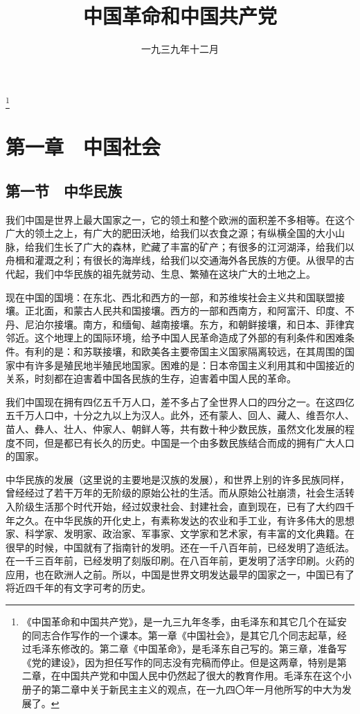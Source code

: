 
\title{中国革命和中国共产党}
\date{一九三九年十二月}
\thanks{《中国革命和中国共产党》，是一九三九年冬季，由毛泽东和其它几个在延安的同志合作写作的一个课本。第一章《中国社会》，是其它几个同志起草，经过毛泽东修改的。第二章《中国革命》，是毛泽东自己写的。第三章，准备写《党的建设》，因为担任写作的同志没有完稿而停止。但是这两章，特别是第二章，在中国共产党和中国人民中仍然起了很大的教育作用。毛泽东在这个小册子的第二章中关于新民主主义的观点，在一九四〇年一月他所写的中大为发展了。}
\maketitle


\section{第一章　中国社会}

\subsection{第一节　中华民族}

我们中国是世界上最大国家之一，它的领土和整个欧洲的面积差不多相等。在这个广大的领土之上，有广大的肥田沃地，给我们以衣食之源；有纵横全国的大小山脉，给我们生长了广大的森林，贮藏了丰富的矿产；有很多的江河湖泽，给我们以舟楫和灌溉之利；有很长的海岸线，给我们以交通海外各民族的方便。从很早的古代起，我们中华民族的祖先就劳动、生息、繁殖在这块广大的土地之上。

现在中国的国境：在东北、西北和西方的一部，和苏维埃社会主义共和国联盟接壤。正北面，和蒙古人民共和国接壤。西方的一部和西南方，和阿富汗、印度、不丹、尼泊尔接壤。南方，和缅甸、越南接壤。东方，和朝鲜接壤，和日本、菲律宾邻近。这个地理上的国际环境，给予中国人民革命造成了外部的有利条件和困难条件。有利的是：和苏联接壤，和欧美各主要帝国主义国家隔离较远，在其周围的国家中有许多是殖民地半殖民地国家。困难的是：日本帝国主义利用其和中国接近的关系，时刻都在迫害着中国各民族的生存，迫害着中国人民的革命。

我们中国现在拥有四亿五千万人口，差不多占了全世界人口的四分之一。在这四亿五千万人口中，十分之九以上为汉人。此外，还有蒙人、回人、藏人、维吾尔人、苗人、彝人、壮人、仲家人、朝鲜人等，共有数十种少数民族，虽然文化发展的程度不同，但是都已有长久的历史。中国是一个由多数民族结合而成的拥有广大人口的国家。

中华民族的发展（这里说的主要地是汉族的发展），和世界上别的许多民族同样，曾经经过了若干万年的无阶级的原始公社的生活。而从原始公社崩溃，社会生活转入阶级生活那个时代开始，经过奴隶社会、封建社会，直到现在，已有了大约四千年之久。在中华民族的开化史上，有素称发达的农业和手工业，有许多伟大的思想家、科学家、发明家、政治家、军事家、文学家和艺术家，有丰富的文化典籍。在很早的时候，中国就有了指南针的发明。还在一千八百年前，已经发明了造纸法。在一千三百年前，已经发明了刻版印刷。在八百年前，更发明了活字印刷。火药的应用，也在欧洲人之前。所以，中国是世界文明发达最早的国家之一，中国已有了将近四千年的有文字可考的历史。

